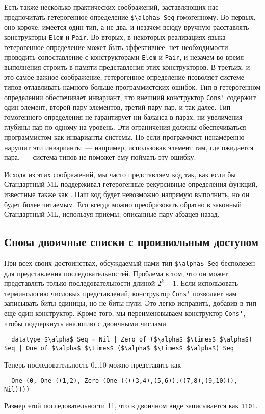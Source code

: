 Есть также несколько практических соображений, заставляющих нас
предпочитать гетерогенное определение \lstinline!$\alpha$ Seq!
гомогенному. Во-первых, оно короче; имеется один тип, а не два, и
незачем всюду вручную расставлять конструкторы \lstinline!Elem! и
\lstinline!Pair!. Во-вторых, в некоторых реализациях языка
гетерогенное определение может быть эффективнее: нет необходимости
проводить сопоставление с конструкторами \lstinline!Elem! и
\lstinline!Pair!, и незачем во время выполнения строить в памяти
представления этих конструкторов. В-третьих, и это самое важное
соображение, гетерогенное определение позволяет системе типов
отлавливать намного больше программистских ошибок. Тип в гетерогенном
определении обеспечивает инвариант, что внешний конструктор
\lstinline!Cons'! содержит один элемент, второй пару элементов, третий
пару пар, и так далее. Тип гомогенного определения не гарантирует ни
баланса в парах, ни увеличения глубины пар по одному на уровень. Эти
ограничения должны обеспечиваться программистом как инварианты
системы. Но если программист ненамеренно нарушит эти инварианты~---
например, использовав элемент там, где ожидается пара,~--- система
типов не поможет ему поймать эту ошибку.

Исходя из этих соображений, мы часто представляем код так, как если бы
Стандартный ML  поддерживал гетерогенные рекурсивные определения
функций, известные также как  \cite{Mycroft1984}. Наш код будет невозможно напрямую
выполнить, но он будет более читаемым. Его всегда можно преобразовать
обратно в законный Стандартный ML, используя приёмы, описанные пару
абзацев назад.

\subsection{Снова двоичные списки с произвольным доступом}
\label{sc:10.1.2}

При всех своих достоинствах, обсуждаемый нами тип
\lstinline!$\alpha$ Seq! бесполезен для представления последовательностей. Проблема в том,
что он может представлять только последовательности длиной $2^k -
1$. Если использовать терминологию числовых представлений, конструктор
\lstinline!Cons'! позволяет нам записывать биты-единицы, но не
биты-нули. Это легко исправить, добавив в тип ещё один
конструктор. Кроме того, мы переименовываем конструктор
\lstinline!Cons'!, чтобы подчеркнуть аналогию с двоичными числами.
\begin{lstlisting}
  datatype $\alpha$ Seq = Nil | Zero of ($\alpha$ $\times$ $\alpha$) Seq | One of $\alpha$ $\times$ ($\alpha$ $\times$ $\alpha$) Seq
\end{lstlisting}
Теперь последовательность 0\ldots 10 можно представить как
\begin{lstlisting}
  One (0, One ((1,2), Zero (One ((((3,4),(5,6)),((7,8),(9,10))), Nil))))
\end{lstlisting}
Размер этой последовательности 11, что в двоичном виде записывается
как \texttt{1101}.

